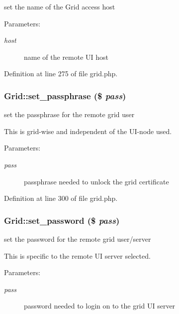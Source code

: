 set the name of the Grid access host 

\begin{Desc}
\item[Parameters:]
\begin{description}
\item[{\em host}]name of the remote UI host \end{description}
\end{Desc}


Definition at line 275 of file grid.php.
\subsubsection{\setlength{\rightskip}{0pt plus 5cm}Grid::set\_\-passphrase (\$ {\em pass})}\label{classGrid_a4}


set the passphrase for the remote grid user 

This is grid-wise and independent of the UI-node used.

\begin{Desc}
\item[Parameters:]
\begin{description}
\item[{\em pass}]passphrase needed to unlock the grid certificate \end{description}
\end{Desc}


Definition at line 300 of file grid.php.
\subsubsection{\setlength{\rightskip}{0pt plus 5cm}Grid::set\_\-password (\$ {\em pass})}\label{classGrid_a3}


set the password for the remote grid user/server 

This is specific to the remote UI server selected.

\begin{Desc}
\item[Parameters:]
\begin{description}
\item[{\em pass}]password needed to login on to the grid UI server \end{description}
\end{Desc}


